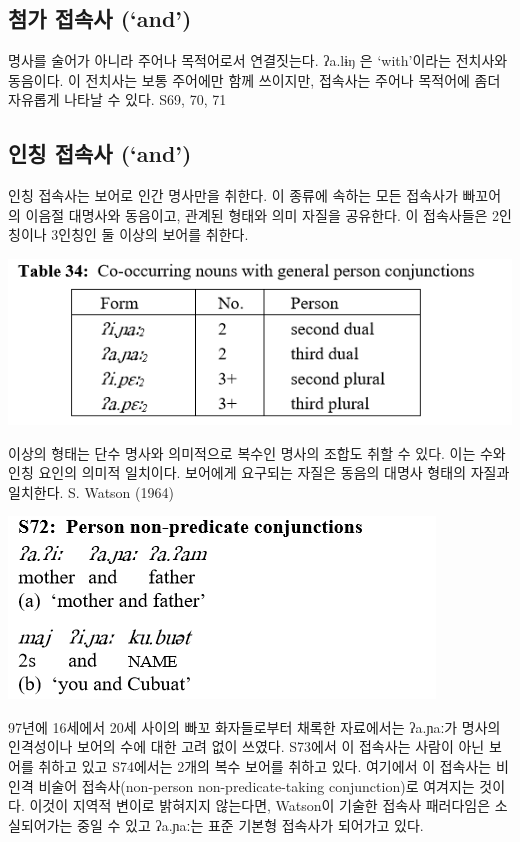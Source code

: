 \subsection{첨가 접속사 (`and')}
명사를 술어가 아니라 주어나 목적어로서 연결짓는다. ʔa.lɨŋ 은 `with'이라는 전치사와 동음이다. 이 전치사는 보통 주어에만 함께 쓰이지만, 접속사는 주어나 목적어에 좀더 자유롭게 나타날 수 있다.
S69, 70, 71 \omission

\subsection{인칭 접속사 (`and')}
인칭 접속사는 보어로 인간 명사만을 취한다. 이 종류에 속하는 모든 접속사가 빠꼬어의 이음절 대명사와 동음이고, 관계된 형태와 의미 자질을 공유한다.
이 접속사들은 2인칭이나 3인칭인 둘 이상의 보어를 취한다.

\includegraphics{Pacoh/src/PacohTable34.png}

이상의 형태는 단수 명사와 의미적으로 복수인 명사의 조합도 취할 수 있다. 이는 수와 인칭 요인의 의미적 일치이다. 보어에게 요구되는 자질은 동음의 대명사 형태의 자질과 일치한다. S. Watson (1964)

\includegraphics{Pacoh/src/PacohS72.png}

97년에 16세에서 20세 사이의 빠꼬 화자들로부터 채록한 자료에서는 ʔa.ɲaː가 명사의 인격성이나 보어의 수에 대한 고려 없이 쓰였다. S73에서 이 접속사는 사람이 아닌 보어를 취하고 있고 S74에서는 2개의 복수 보어를 취하고 있다. 여기에서 이 접속사는 비인격 비술어 접속사(non-person non-predicate-taking conjunction)로 여겨지는 것이다. 이것이 지역적 변이로 밝혀지지 않는다면, Watson이 기술한 접속사 패러다임은 소실되어가는 중일 수 있고 ʔa.ɲaː는 표준 기본형 접속사가 되어가고 있다.

